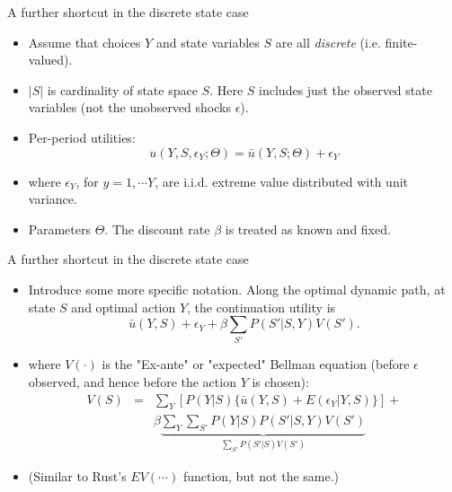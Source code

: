 \begin{frame}{A further shortcut in the discrete state case}
\begin{itemize}
\item Assume that choices $Y$ and state variables $S$ are all \emph{discrete} (i.e. finite-valued).
\item  $|S|$ is cardinality of state space $S$. Here $S$ includes just the observed state variables (not  the unobserved shocks $\epsilon$). 
\item Per-period utilities:
\begin{equation*}
u(Y, S, \epsilon_Y; \Theta) = \bar u (Y, S; \Theta) + \epsilon_Y
\end{equation*}
\item where $\epsilon_Y$, for $y=1, \cdots Y$, are i.i.d. extreme value distributed with unit variance. \\
\item Parameters $\Theta$. The discount rate $\beta$ is treated as known and fixed. \\
\end{itemize}
\end{frame}

\begin{frame}{A further shortcut in the discrete state case}
\begin{itemize}
\item Introduce some more specific notation. Along the optimal dynamic path, at state $S$ and optimal action $Y$, the continuation utility is
\begin{equation*}
\bar u (Y,S) + \epsilon_Y + \beta \sum_{S'} P(S' | S, Y) V(S').
\end{equation*}
\item where $V(\cdot)$ is the "Ex-ante" or "expected" Bellman equation (before $\epsilon$ observed, and hence before the action $Y$ is chosen):
\begin{eqnarray}
\nonumber V(S) &= & \sum_Y [ P(Y|S) \{ \bar u (Y,S) + E(\epsilon_Y | Y, S) \} ] +\\ 
&& \beta \underbrace{\sum_Y \sum_{S'} P(Y|S) P(S'|S, Y) V(S')}_{\sum_{S'} P(S' | S) V(S') }  
\end{eqnarray}
\item (Similar to Rust's $EV(\cdots)$ function, but \alert{not the same}.)
\end{itemize}
\end{frame}

